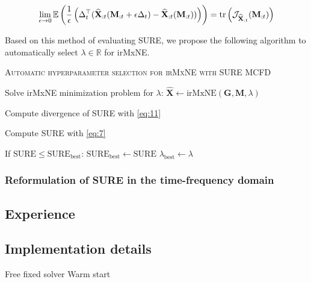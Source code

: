 \begin{equation*}
    \lim_{\epsilon \rightarrow 0} \mathbb{E} \left(
        \frac{1}{\epsilon}
        \left(
            \Delta_t^{\top} (\widehat{\mathbf{X}}_{:t}(\mathbf{M}_{:t}
            + \epsilon \Delta_t) - \widehat{\mathbf{X}}_{:t}(\mathbf{M}_{:t}))
        \right)
    \right)
    = \operatorname{tr} \left(
        \mathcal{J}_{\widehat{\mathbf{X}}_{:t}}(\mathbf{M}_{:t})
    \right)
\end{equation*}
%


Based on this method of evaluating SURE, we propose the following algorithm to automatically select $\lambda \in \mathbb{R}$ for irMxNE.

\vskip 0.2in

{\fontsize{4}{4}\selectfont
\begin{algorithm}[h]  %
\caption{\textsc{Automatic hyperparameter selection for irMxNE with SURE MCFD}
}
%

    {
        Solve irMxNE minimization problem for $\lambda$:
        $\widehat{\mathbf{X}} \leftarrow \text{irMxNE}(\mathbf{G}, \mathbf{M}, \lambda)$

        Compute divergence of SURE with \eqref{eq:11}

        Compute SURE with \eqref{eq:7}

        If $\text{SURE} \leq \text{SURE}_{\text{best}}$:
        $\text{SURE}_{\text{best}} \leftarrow \text{SURE}$
        $\lambda_{\text{best}} \leftarrow \lambda$
    }

\end{algorithm}
}

\subsubsection{Reformulation of SURE in the time-frequency domain}


\subsection{Experience}
\label{sub:experience}
%

\subsection{Implementation details}
\label{sub:experience}
%
Free fixed solver
Warm start

\clearpage
